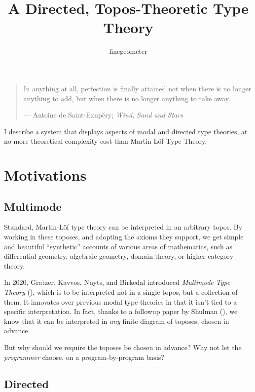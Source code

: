 \documentclass{article}
\title{A Directed, Topos-Theoretic Type Theory}
\author{finegeometer}
\begin{document}
\maketitle


\begin{quotation}
    In anything at all, perfection is finally attained not when there is no longer anything to add, but when there is no longer anything to take away.

    --- Antoine de Saint-Exupéry; \emph{Wind, Sand and Stars}
\end{quotation}

I describe a system that displays aspects of modal and directed type theories,
at no more theoretical complexity cost than Martin L\"of Type Theory.

\tableofcontents

\section{Motivations}

\subsection{Multimode}

Standard, Martin-L\"of type theory can be interpreted in an arbitrary topos.
By working in these toposes, and adopting the axioms they support,
we get simple and beautiful ``synthetic'' accounts of various areas of mathematics,
such as differential geometry, algebraic geometry, domain theory, or higher category theory. 

In 2020, Gratzer, Kavvos, Nuyts, and Birkedal introduced \emph{Multimode Type Theory} (\cite{MTT}),
which is to be interpreted not in a single topos, but a collection of them.
It innovates over previous modal type theories in that it isn't tied to a specific interpretation.
In fact, thanks to a followup paper by Shulman (\cite{MTT_Shulman}), we know that it can be interpreted
in \emph{any} finite diagram of toposes, chosen in advance.

But why should we require the toposes be chosen in advance?
Why not let the \emph{programmer} choose, on a program-by-program basis?

\subsection{Directed}
\end{document}
